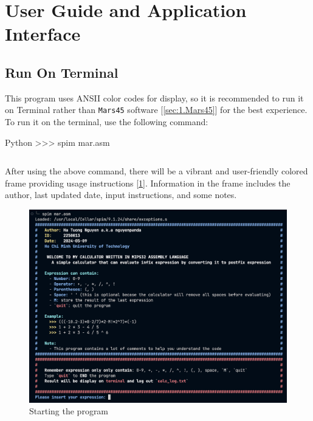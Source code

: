 \section{User Guide and Application Interface}
\label{sec:1.Guide&Interface}

\subsection{Run On Terminal}
\label{sec:1.Terminal}
    This program uses ANSII color codes for display, so it is recommended to run it on Terminal rather than \texttt{Mars45} software [\ref{sec:1.Mars45}] for the best experience. To run it on the terminal, use the following command:
    
    \begin{code}{Python}
        >>> spim mar.asm
    \end{code}
    \begin{lstlisting}[language=bash, caption={Running the program on Terminal}]
    \end{lstlisting}
    
    After using the above command, there will be a vibrant and user-friendly colored frame providing usage instructions [\ref{fig:1.InitProgram}]. Information in the frame includes the author, last updated date, input instructions, and some notes.
    
    \begin{figure}[htbp]
        \centering
        \includegraphics[width=1\textwidth]{graphics/1.Init.png}
        \caption{Starting the program}
        \label{fig:1.InitProgram}
    \end{figure}
    
